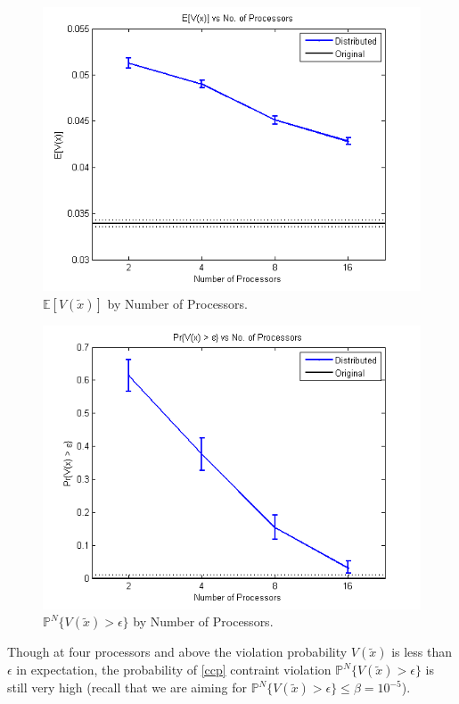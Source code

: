 \documentclass[12pt]{article}
\begin{document}
\begin{figure}[ht]
	\centering
		\includegraphics[scale=0.9]{../plot/figs/expviolprob_numproc.png}
	\caption{$\mathbb{E}[V(\tilde{x})]$ by Number of Processors.}
	\label{fig:expviolprob_numproc}
\end{figure}

\begin{figure}[ht]
	\centering
		\includegraphics[scale=0.9]{../plot/figs/probviolprobgreateps_numproc.png}
	\caption{$\mathbb{P}^N\{V(\tilde{x}) > \epsilon \}$ by Number of Processors.}
	\label{fig:probviolprobgreateps_numproc}
\end{figure}

Though at four processors and above the violation probability $V(\tilde{x})$ is less than $\epsilon$ in expectation, the probability of \ref{ccp} contraint violation $\mathbb{P}^N\{V(\tilde{x}) > \epsilon \}$ is still very high (recall that we are aiming for $\mathbb{P}^N\{V(\tilde{x}) > \epsilon \} \leq \beta = 10^{-5}$).
\end{document}
